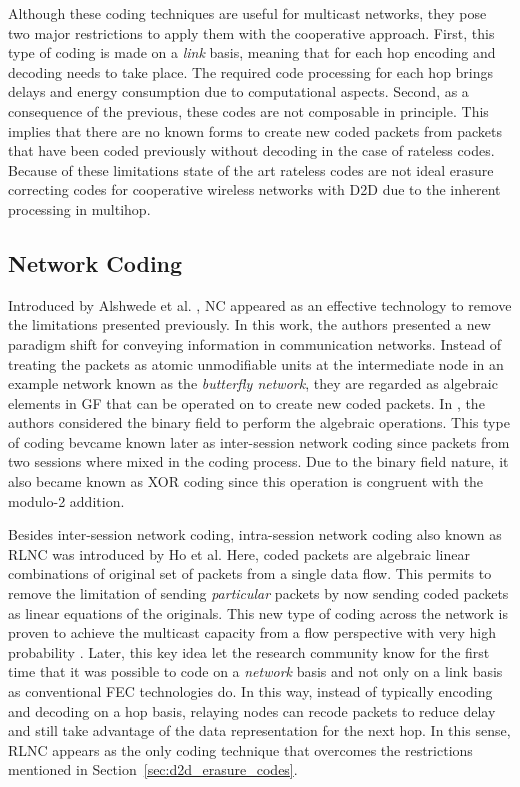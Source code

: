 Although these coding techniques are useful for multicast networks, they pose two major restrictions to apply them with the cooperative approach. First, this type of coding is made on a \textit{link} basis, meaning that for each hop encoding and decoding needs to take place. The required code processing for each hop brings delays and energy consumption due to computational aspects. Second, as a consequence of the previous, these codes are not composable in principle. This implies that there are no known forms to create new coded packets from packets that have been coded previously without decoding in the case of rateless codes. Because of these limitations state of the art rateless codes are not ideal erasure correcting codes for cooperative wireless networks with \ac{D2D} due to the inherent processing in multihop.

\subsection{Network Coding}
\label{sec:nc_rlnc}
Introduced by Alshwede et al. \cite{ahlswede2000network}, \ac{NC} appeared as an effective technology to remove the limitations presented previously. In this work, the authors presented a new paradigm shift for conveying information in communication networks. Instead of treating the packets as atomic unmodifiable units at the intermediate node in an example network known as the \textit{butterfly network}, they are regarded as algebraic elements in \ac{GF} that can be operated on to create new coded packets. In \cite{ahlswede2000}, the authors considered the binary field to perform the algebraic operations. This type of coding bevcame known later as inter-session network coding since packets from two sessions where mixed in the coding process. Due to the binary field nature, it also became known as XOR coding since this operation is congruent with the modulo-2 addition.

Besides inter-session network coding, intra-session network coding also known as \ac{RLNC} \cite{ho2006random} was introduced by Ho et al. Here, coded packets are algebraic linear combinations of original set of packets from a single data flow. This permits to remove the limitation of sending \textit{particular} packets by now sending coded packets as linear equations of the originals. This new type of coding across the network is proven to achieve the multicast capacity from a flow perspective with very high probability \cite{koetter2003algebraic,ho2006random}. Later, this key idea let the research community know for the first time that it was possible to code on a \textit{network} basis and not only on a link basis as conventional \ac{FEC} technologies do. In this way, instead of typically encoding and decoding on a hop basis, relaying nodes can recode packets to reduce delay and still take advantage of the data representation for the next hop. In this sense, \ac{RLNC} appears as the only coding technique that overcomes the restrictions mentioned in Section~\ref{sec:d2d_erasure_codes}.

